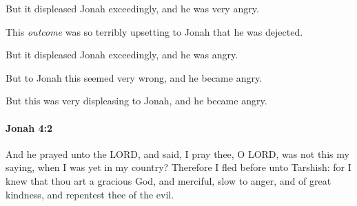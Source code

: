 			But it displeased Jonah exceedingly, and he was very angry.

			\begin{versebox}
					\item[BHS] 
					\item[LXX] 
					\item[AB 1990 270] This \textit{outcome} was so terribly upsetting to Jonah that he was dejected.
					\item[ASV] But it displeased Jonah exceedingly, and he was angry.
					\item[NIV] But to Jonah this seemed very wrong, and he became angry.
					\item[NRSV] But this was very displeasing to Jonah, and he became angry.
			\end{versebox}

		\paragraph{Jonah 4:2} %
			\label{JONAH-4-2}

			And he prayed unto the LORD, and said, I pray thee, O LORD, was not this my saying, when I was yet in my country? Therefore I fled before unto Tarshish: for I knew that thou art a gracious God, and merciful, slow to anger, and of great kindness, and repentest thee of the evil.


